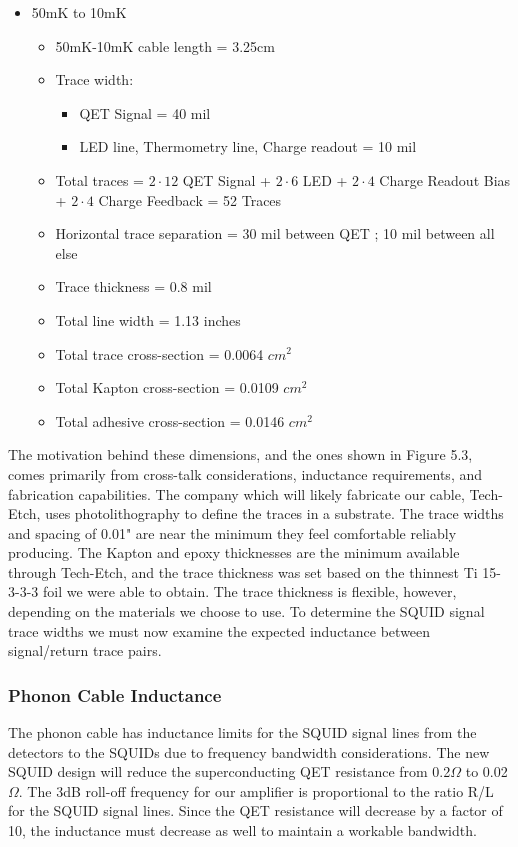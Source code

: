\documentclass{report}
\begin{document}
\begin{itemize}
\item 50mK to 10mK
    \begin{itemize}
    \item 50mK-10mK cable length = 3.25cm
    \item Trace width:
        \begin{itemize}
        \item QET Signal = 40 mil
        \item LED line, Thermometry line, Charge readout = 10 mil
        \end{itemize}
    \item Total traces = $2\cdot12$ QET Signal + $2\cdot6$ LED + $2\cdot4$ Charge Readout Bias + $2\cdot4$ Charge Feedback = 52 Traces
    \item Horizontal trace separation = 30 mil between QET ; 10 mil between all else
    \item Trace thickness = 0.8 mil
    \item Total line width = 1.13 inches
    \item Total trace cross-section = 0.0064 $cm^2$
    \item Total Kapton cross-section = 0.0109 $cm^2$
    \item Total adhesive cross-section = 0.0146 $cm^2$
    \end{itemize}
\end{itemize}

The motivation behind these dimensions, and the ones shown in Figure 5.3, comes primarily from cross-talk considerations, inductance requirements, and fabrication capabilities. The company which will likely fabricate our cable, Tech-Etch, uses photolithography to define the traces in a substrate. The trace widths and spacing of 0.01" are near the minimum they feel comfortable reliably producing. The Kapton and epoxy thicknesses are the minimum available through Tech-Etch, and the trace thickness was set based on the thinnest Ti 15-3-3-3 foil we were able to obtain. The trace thickness is flexible, however, depending on the materials we choose to use. To determine the SQUID signal trace widths we must now examine the expected inductance between signal/return trace pairs.

\subsubsection{Phonon Cable Inductance}

The phonon cable has inductance limits for the SQUID signal lines from the detectors to the SQUIDs due to frequency bandwidth considerations. The new SQUID design will reduce the superconducting QET resistance from 0.2$\Omega$ to 0.02$\Omega$. The 3dB roll-off frequency for our amplifier is proportional to the ratio R/L for the SQUID signal lines. Since the QET resistance will decrease by a factor of 10, the inductance must decrease as well to maintain a workable bandwidth.
\end{document}
